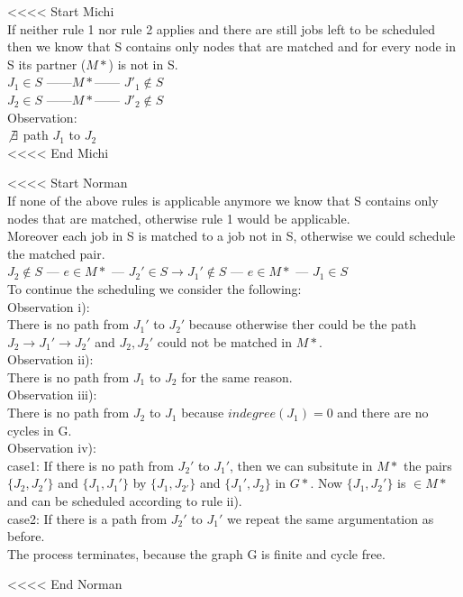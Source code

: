 <<<< Start Michi \\
If neither rule 1 nor rule 2 applies and there are still jobs left to be scheduled then we know that S contains only nodes that are matched
and for every node in S its partner ($M*$) is not in S.\\

$J{_1} \in S$ ------$M*$------
$J'{_1} \notin S$\\

$J{_2} \in S$ ------$M*$------
$J'{_2} \notin S$\\

Observation:\\
$\not\exists$ path $J_{1}$ to $J_{2}$ \\
<<<< End Michi

<<<< Start Norman \\
 If none of the above rules is applicable anymore we know that S contains only nodes that are matched, otherwise rule 1 would be applicable.\\
 Moreover each job in S is matched to a job not in S, otherwise we could schedule the matched pair. \\
  $ J_{2} \not\in S$ --- $ e\in M*$ --- $J_{2}' \in S \rightarrow J_{1}' \not\in S$  --- $ e\in M*$ --- $ J_{1} \in S$ \\
 To continue the scheduling we consider the following:\\
 Observation i):\\
 There is no path from $J_{1}'$ to $J_{2}'$ because otherwise ther could be the path $J_{2} \rightarrow J_{1}' \rightarrow J_{2}'$ and $J_{2},J_{2}'$ could not be matched in $M*$.\\
 \newline
 Observation ii):\\
 There is no path from $J_{1}$ to $J_{2}$ for the same reason. \\
 \newline
 Observation iii): \\
 There is no path from $J_{2}$ to $J_{1}$ because $indegree(J_{1})=0$ and there are no cycles in G.\\
 \newline
 Observation iv): \\
 case1: If there is no path from $J_{2}'$ to $J_{1}'$, then we can subsitute in $M*$ the pairs $\{ J_{2}, J_{2}' \}$ and  $\{ J_{1}, J_{1}' \}$ by $\{ J_{1}, J_{2'} \}$ and $\{ J_{1}', J_{2} \}$ in $G*$. Now $\{ J_{1}, J_{2}' \}$ is $\in M*$ and can be scheduled according to rule ii). \\
 case2: If there is a path from $J_{2}'$ to $J_{1}'$ we repeat the same argumentation as before. \\
 \newline
 The process terminates, because the graph G is finite and cycle free.
 
<<<< End Norman \\



